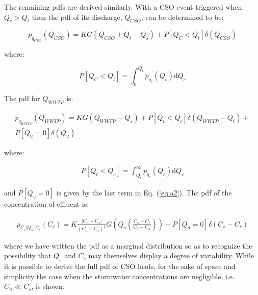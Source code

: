 \documentclass{agujournal2018}
\begin{document}
The remaining pdfs are derived similarly. With a CSO event triggered when $Q_c > Q_t$ then the pdf of its discharge, $Q_{CSO}$, can be determined to be:
\begin{linenomath*}
\begin{equation}	
p_{q_{CSO}}\left(Q_{CSO} \right) = K G\left(Q_{CSO}+Q_t-Q_s \right) + P\left[Q_{C} < Q_t\right] \delta\left(Q_{CSO}\right)
\label{eq:a6}
\end{equation}
\end{linenomath*}
where:
\begin{linenomath*}
\begin{equation}	
P\left[ Q_{C} < Q_t\right] = \int_{0}^{Q_t} p_{q_c}\left(Q_c\right) \mathrm{d}Q_c 
\label{eq:a7}
\end{equation}
\end{linenomath*}
The pdf for $Q_{WWTP}$ is:
\begin{linenomath*}
\begin{eqnarray}\nonumber
p_{q_{WWTP}}\left(Q_{WWTP}\right) = K G\left( Q_{WWTP} - Q_s\right) + P\left[Q_t < Q_c\right]\delta\left(Q_{WWTP} - Q_t\right) + \\
P\left[Q_u = 0\right]\delta\left(Q_{u}\right)
\label{eq:a8}
\end{eqnarray}
\end{linenomath*}
where:
\begin{linenomath*}
\begin{eqnarray}
P\left[Q_t < Q_c\right] = \int_{Q_t}^{\infty} p_{q_c}\left(Q_c\right)\mathrm{d}Q_c 
\label{eq:a9}
\end{eqnarray}
\end{linenomath*}
and $P\left[Q_u=0\right]$ is given by the last term in Eq. (\ref{eq:a2}). The pdf of the concentration of ef\/f\/luent is:
\begin{linenomath*}
\begin{eqnarray}
p_{C_c | Q_s, C_s}\left(C_c \right) = K \frac{\left| C_u - C_s \right|}{\left(C_u - C_c \right)^2}  G\left(Q_s \left(\frac{C_s-C_c}{C_c-C_u }\right) \right) +  P\left[Q_u = 0\right] \delta\left(C_s - C_c\right) 
\label{eq:a10}
\end{eqnarray}
\end{linenomath*}
where we have written the pdf as a marginal distribution so as to recognize the possibility that $Q_s$ and $C_s$ may themselves display a degree of variability. While it is possible to derive the full pdf of CSO loads, for the sake of space and simplicity the case when the stormwater concentrations are negligible, i.e. $C_u\ll C_s$, is shown:
\end{document}

